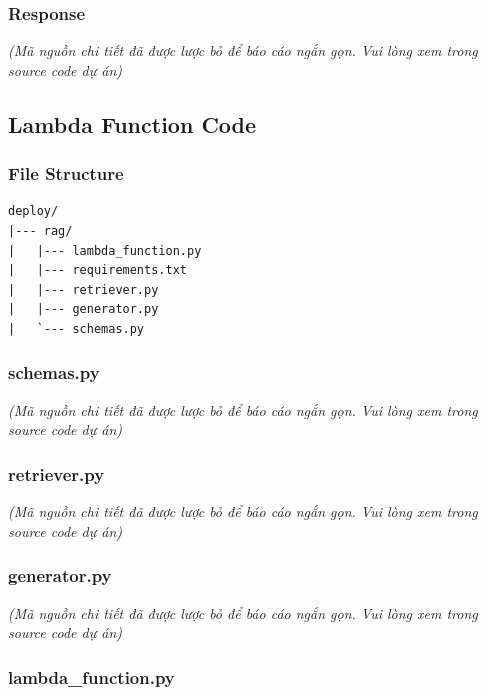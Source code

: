\hypertarget{response}{%
\subsubsection{Response}}

\emph{(Mã nguồn chi tiết đã được lược bỏ để báo cáo ngắn gọn. Vui lòng
xem trong source code dự án)}

\hypertarget{lambda-function-code}{%
\subsection{Lambda Function Code}}

\hypertarget{file-structure}{%
\subsubsection{File Structure}}

\begin{verbatim}
deploy/
|--- rag/
|   |--- lambda_function.py
|   |--- requirements.txt
|   |--- retriever.py
|   |--- generator.py
|   `--- schemas.py
\end{verbatim}

\hypertarget{schemas.py}{%
\subsubsection{schemas.py}}

\emph{(Mã nguồn chi tiết đã được lược bỏ để báo cáo ngắn gọn. Vui lòng
xem trong source code dự án)}

\hypertarget{retriever.py}{%
\subsubsection{retriever.py}}

\emph{(Mã nguồn chi tiết đã được lược bỏ để báo cáo ngắn gọn. Vui lòng
xem trong source code dự án)}

\hypertarget{generator.py}{%
\subsubsection{generator.py}}

\emph{(Mã nguồn chi tiết đã được lược bỏ để báo cáo ngắn gọn. Vui lòng
xem trong source code dự án)}

\hypertarget{lambda_function.py}{%
\subsubsection{lambda\_function.py}}

